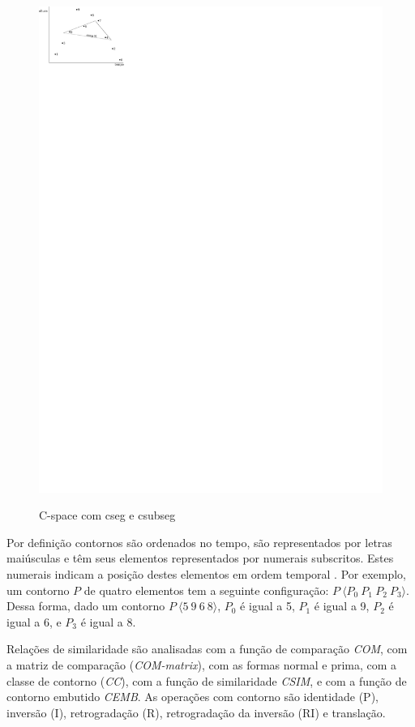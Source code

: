 \documentclass[brazil]{article}
\newcommand{\termo}[1]{\textit{#1}}
\begin{document}
\begin{figure}
{    \includegraphics{cspace-564}
    \label{fig:c-space564}
  }
  \caption{C-space com cseg e csubseg}
  \label{fig:c-space}
\end{figure}

Por definição contornos são ordenados no tempo, são representados por
letras maiúsculas e têm seus elementos representados por numerais
subscritos. Estes numerais indicam a posição destes elementos em ordem
temporal \cite{marvin.ea87:relating}. Por exemplo, um contorno $P$ de
quatro elementos tem a seguinte configuração: $P\:\langle
P_0\:P_1\:P_2\:P_3\rangle$. Dessa forma, dado um contorno
$P\:\langle5\:9\:6\:8\rangle$, $P_0$ é igual a 5, $P_1$ é igual a 9,
$P_2$ é igual a 6, e $P_3$ é igual a 8.

Relações de similaridade \cite{marvin.ea87:relating} são analisadas
com a função de comparação \termo{COM}, com a matriz de comparação
(\termo{COM-matrix}), com as formas normal e prima, com a classe de
contorno (\termo{CC}), com a função de similaridade \termo{CSIM}, e
com a função de contorno embutido \termo{CEMB}. As operações com
contorno são identidade (P), inversão (I), retrogradação (R),
retrogradação da inversão (RI) e translação.
\end{document}
